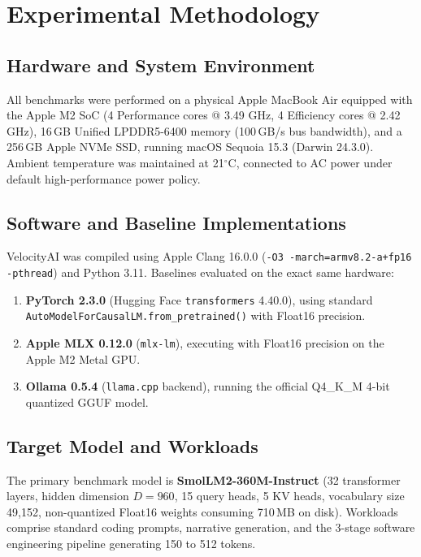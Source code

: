 \documentclass[10pt,twocolumn]{article}
\begin{document}
\section{Experimental Methodology}

\subsection{Hardware and System Environment}
All benchmarks were performed on a physical Apple MacBook Air equipped with the Apple M2 SoC (4 Performance cores @ 3.49 GHz, 4 Efficiency cores @ 2.42 GHz), 16\,GB Unified LPDDR5-6400 memory (100\,GB/s bus bandwidth), and a 256\,GB Apple NVMe SSD, running macOS Sequoia 15.3 (Darwin 24.3.0). Ambient temperature was maintained at 21$^\circ$C, connected to AC power under default high-performance power policy.

\subsection{Software and Baseline Implementations}
VelocityAI was compiled using Apple Clang 16.0.0 (\texttt{-O3 -march=armv8.2-a+fp16 -pthread}) and Python 3.11. Baselines evaluated on the exact same hardware:
\begin{enumerate}
    \item \textbf{PyTorch 2.3.0} (Hugging Face \texttt{transformers} 4.40.0), using standard \texttt{AutoModelForCausalLM.from\_pretrained()} with Float16 precision.
    \item \textbf{Apple MLX 0.12.0} (\texttt{mlx-lm}), executing with Float16 precision on the Apple M2 Metal GPU.
    \item \textbf{Ollama 0.5.4} (\texttt{llama.cpp} backend), running the official Q4\_K\_M 4-bit quantized GGUF model.
\end{enumerate}

\subsection{Target Model and Workloads}
The primary benchmark model is \textbf{SmolLM2-360M-Instruct} \cite{smollm2} (32 transformer layers, hidden dimension $D = 960$, 15 query heads, 5 KV heads, vocabulary size 49,152, non-quantized Float16 weights consuming 710\,MB on disk). Workloads comprise standard coding prompts, narrative generation, and the 3-stage software engineering pipeline generating 150 to 512 tokens.
\end{document}
